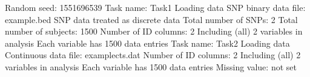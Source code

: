 \documentclass[letterpaper,10pt,english]{sphinxmanual}
\begin{document}
\begin{sphinxVerbatim}[commandchars=\\\{\}]
Random seed: 1551696539
\PYGZhy{}\PYGZhy{}\PYGZhy{}\PYGZhy{}\PYGZhy{}\PYGZhy{}\PYGZhy{}\PYGZhy{}\PYGZhy{}\PYGZhy{}\PYGZhy{}\PYGZhy{}\PYGZhy{}\PYGZhy{}\PYGZhy{}\PYGZhy{}\PYGZhy{}\PYGZhy{}\PYGZhy{}\PYGZhy{}\PYGZhy{}\PYGZhy{}\PYGZhy{}\PYGZhy{}\PYGZhy{}\PYGZhy{}\PYGZhy{}\PYGZhy{}\PYGZhy{}\PYGZhy{}\PYGZhy{}\PYGZhy{}\PYGZhy{}\PYGZhy{}\PYGZhy{}\PYGZhy{}\PYGZhy{}\PYGZhy{}\PYGZhy{}\PYGZhy{}\PYGZhy{}\PYGZhy{}\PYGZhy{}\PYGZhy{}\PYGZhy{}\PYGZhy{}\PYGZhy{}\PYGZhy{}\PYGZhy{}\PYGZhy{}
Task name: Task\PYGZhy{}1
Loading data
SNP binary data file: example.bed
SNP data treated as discrete data
Total number of SNPs: 2
Total number of subjects: 1500
Number of ID columns: 2
Including (all) 2 variables in analysis
Each variable has 1500 data entries
\PYGZhy{}\PYGZhy{}\PYGZhy{}\PYGZhy{}\PYGZhy{}\PYGZhy{}\PYGZhy{}\PYGZhy{}\PYGZhy{}\PYGZhy{}\PYGZhy{}\PYGZhy{}\PYGZhy{}\PYGZhy{}\PYGZhy{}\PYGZhy{}\PYGZhy{}\PYGZhy{}\PYGZhy{}\PYGZhy{}\PYGZhy{}\PYGZhy{}\PYGZhy{}\PYGZhy{}\PYGZhy{}\PYGZhy{}\PYGZhy{}\PYGZhy{}\PYGZhy{}\PYGZhy{}\PYGZhy{}\PYGZhy{}\PYGZhy{}\PYGZhy{}\PYGZhy{}\PYGZhy{}\PYGZhy{}\PYGZhy{}\PYGZhy{}\PYGZhy{}\PYGZhy{}\PYGZhy{}\PYGZhy{}\PYGZhy{}\PYGZhy{}\PYGZhy{}\PYGZhy{}\PYGZhy{}\PYGZhy{}\PYGZhy{}
\PYGZhy{}\PYGZhy{}\PYGZhy{}\PYGZhy{}\PYGZhy{}\PYGZhy{}\PYGZhy{}\PYGZhy{}\PYGZhy{}\PYGZhy{}\PYGZhy{}\PYGZhy{}\PYGZhy{}\PYGZhy{}\PYGZhy{}\PYGZhy{}\PYGZhy{}\PYGZhy{}\PYGZhy{}\PYGZhy{}\PYGZhy{}\PYGZhy{}\PYGZhy{}\PYGZhy{}\PYGZhy{}\PYGZhy{}\PYGZhy{}\PYGZhy{}\PYGZhy{}\PYGZhy{}\PYGZhy{}\PYGZhy{}\PYGZhy{}\PYGZhy{}\PYGZhy{}\PYGZhy{}\PYGZhy{}\PYGZhy{}\PYGZhy{}\PYGZhy{}\PYGZhy{}\PYGZhy{}\PYGZhy{}\PYGZhy{}\PYGZhy{}\PYGZhy{}\PYGZhy{}\PYGZhy{}\PYGZhy{}\PYGZhy{}
Task name: Task\PYGZhy{}2
Loading data
Continuous data file: example\PYGZhy{}cts.dat
Number of ID columns: 2
Including (all) 2 variables in analysis
Each variable has 1500 data entries
Missing value: not set
\PYGZhy{}\PYGZhy{}\PYGZhy{}\PYGZhy{}\PYGZhy{}\PYGZhy{}\PYGZhy{}\PYGZhy{}\PYGZhy{}\PYGZhy{}\PYGZhy{}\PYGZhy{}\PYGZhy{}\PYGZhy{}\PYGZhy{}\PYGZhy{}\PYGZhy{}\PYGZhy{}\PYGZhy{}\PYGZhy{}\PYGZhy{}\PYGZhy{}\PYGZhy{}\PYGZhy{}\PYGZhy{}\PYGZhy{}\PYGZhy{}\PYGZhy{}\PYGZhy{}\PYGZhy{}\PYGZhy{}\PYGZhy{}\PYGZhy{}\PYGZhy{}\PYGZhy{}\PYGZhy{}\PYGZhy{}\PYGZhy{}\PYGZhy{}\PYGZhy{}\PYGZhy{}\PYGZhy{}\PYGZhy{}\PYGZhy{}\PYGZhy{}\PYGZhy{}\PYGZhy{}\PYGZhy{}\PYGZhy{}\PYGZhy{}
\PYGZhy{}\PYGZhy{}\PYGZhy{}\PYGZhy{}\PYGZhy{}\PYGZhy{}\PYGZhy{}\PYGZhy{}\PYGZhy{}\PYGZhy{}\PYGZhy{}\PYGZhy{}\PYGZhy{}\PYGZhy{}\PYGZhy{}\PYGZhy{}\PYGZhy{}\PYGZhy{}\PYGZhy{}\PYGZhy{}\PYGZhy{}\PYGZhy{}\PYGZhy{}\PYGZhy{}\PYGZhy{}\PYGZhy{}\PYGZhy{}\PYGZhy{}\PYGZhy{}\PYGZhy{}\PYGZhy{}\PYGZhy{}\PYGZhy{}\PYGZhy{}\PYGZhy{}\PYGZhy{}\PYGZhy{}\PYGZhy{}\PYGZhy{}\PYGZhy{}\PYGZhy{}\PYGZhy{}\PYGZhy{}\PYGZhy{}\PYGZhy{}\PYGZhy{}\PYGZhy{}\PYGZhy{}\PYGZhy{}\PYGZhy{}

\end{sphinxVerbatim}
\end{document}

